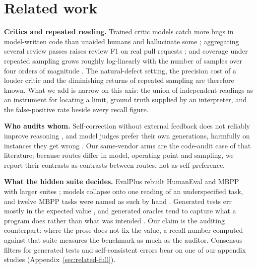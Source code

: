 \section{Related work}

\textbf{Critics and repeated reading.} Trained critic models catch more bugs in model-written code
than unaided humans and hallucinate some \citep{mcaleese2024critics}; aggregating several review
passes raises review F1 on real pull requests \citep{zeng2025swrbench}; and coverage under repeated
sampling grows roughly log-linearly with the number of samples over four orders of magnitude
\citep{brown2024monkeys}. The natural-defect setting, the
precision cost of a louder critic and the diminishing returns of repeated sampling are therefore known.
What we add is narrow on this axis: the union of independent readings as an instrument for locating
a limit, ground truth supplied by an interpreter, and the false-positive rate beside every recall
figure.

\textbf{Who audits whom.} Self-correction without external feedback does not reliably improve
reasoning \citep{huang2024selfcorrect}, and model judges prefer their own generations, harmfully on
instances they get wrong \citep{chen2025selfpreference}. Our same-vendor arms are the code-audit case
of that literature; because routes differ in model, operating point and sampling, we report their
contrasts as contrasts between routes, not as self-preference.

\textbf{What the hidden suite decides.} EvalPlus rebuilt HumanEval and MBPP with larger suites
\citep{liu2023evalplus}; models collapse onto one reading of an underspecified task, and twelve MBPP
tasks were named as such by hand \citep{richter2026collapse}. Generated tests err mostly in the
expected value \citep{xiong2023testing}, and generated oracles tend to capture what a program does
rather than what was intended \citep{konstantinou2024oracles}. Our claim is the auditing counterpart:
where the prose does not fix the value, a recall number computed against that suite measures the
benchmark as much as the auditor. Consensus filters for generated tests
\citep{taherkhani2026consistency, xu2025consensus} and self-consistent errors \citep{tan2025consistent}
bear on one of our appendix studies (Appendix~\ref{sec:related-full}).

